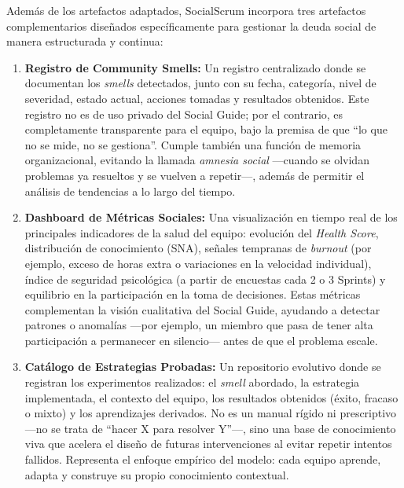 Además de los artefactos adaptados, SocialScrum incorpora tres artefactos complementarios diseñados específicamente para gestionar la deuda social de manera estructurada y continua:

\begin{enumerate}
    \item \textbf{Registro de Community Smells:}
          Un registro centralizado donde se documentan los \textit{smells} detectados, junto con su fecha, categoría, nivel de severidad, estado actual, acciones tomadas y resultados obtenidos.
          Este registro no es de uso privado del Social Guide; por el contrario, es completamente transparente para el equipo, bajo la premisa de que ``lo que no se mide, no se gestiona''.
          Cumple también una función de memoria organizacional, evitando la llamada \textit{amnesia social} —cuando se olvidan problemas ya resueltos y se vuelven a repetir—, además de permitir el análisis de tendencias a lo largo del tiempo.

    \item \textbf{Dashboard de Métricas Sociales:}
          Una visualización en tiempo real de los principales indicadores de la salud del equipo: evolución del \textit{Health Score}, distribución de conocimiento (SNA), señales tempranas de \textit{burnout} (por ejemplo, exceso de horas extra o variaciones en la velocidad individual), índice de seguridad psicológica (a partir de encuestas cada 2 o 3 Sprints) y equilibrio en la participación en la toma de decisiones.
          Estas métricas complementan la visión cualitativa del Social Guide, ayudando a detectar patrones o anomalías —por ejemplo, un miembro que pasa de tener alta participación a permanecer en silencio— antes de que el problema escale.

    \item \textbf{Catálogo de Estrategias Probadas:}
          Un repositorio evolutivo donde se registran los experimentos realizados: el \textit{smell} abordado, la estrategia implementada, el contexto del equipo, los resultados obtenidos (éxito, fracaso o mixto) y los aprendizajes derivados.
          No es un manual rígido ni prescriptivo —no se trata de ``hacer X para resolver Y''—, sino una base de conocimiento viva que acelera el diseño de futuras intervenciones al evitar repetir intentos fallidos.
          Representa el enfoque empírico del modelo: cada equipo aprende, adapta y construye su propio conocimiento contextual.


\end{enumerate}


